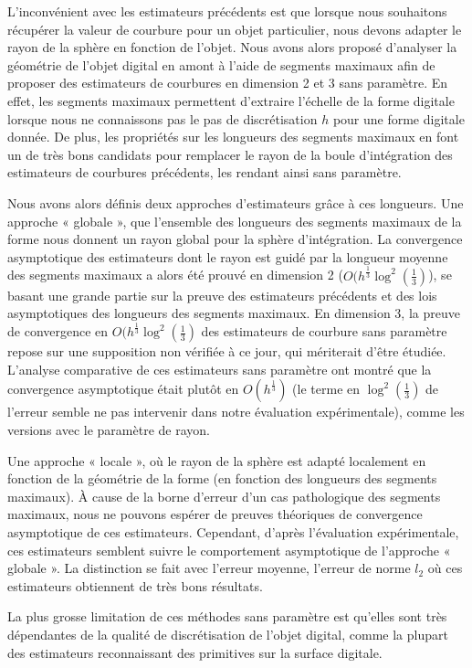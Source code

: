 L'inconvénient avec les estimateurs précédents est que lorsque nous souhaitons
récupérer la valeur de courbure pour un objet particulier, nous devons adapter
le rayon de la sphère en fonction de l'objet. Nous avons alors proposé
d'analyser la géométrie de l'objet digital en amont à l'aide de segments
maximaux afin de proposer des estimateurs de courbures en dimension 2 et 3 sans
paramètre. En effet, les segments maximaux permettent d'extraire l'échelle de la
forme digitale lorsque nous ne connaissons pas le pas de discrétisation $h$ pour
une forme digitale donnée. De plus, les propriétés sur les longueurs des
segments maximaux en font un de très bons candidats pour remplacer le rayon de
la boule d'intégration des estimateurs de courbures précédents, les rendant
ainsi sans paramètre.


Nous avons alors définis deux approches d'estimateurs grâce à ces longueurs. Une
approche « globale », \cad que l'ensemble des longueurs des segments maximaux de
la forme nous donnent un rayon global pour la sphère d'intégration. La
convergence asymptotique des estimateurs dont le rayon est guidé par la longueur
moyenne des segments maximaux a alors été prouvé en dimension 2
($O(h^\frac{1}{3} \log^2 \left(\frac{1}{3}\right)$), se basant une grande partie
sur la preuve des estimateurs précédents et des lois asymptotiques des longueurs
des segments maximaux. En dimension 3, la preuve de convergence en
$O(h^\frac{1}{3} \log^2 \left(\frac{1}{3}\right)$ des estimateurs de courbure
sans paramètre repose sur une supposition non vérifiée à ce jour, qui mériterait
d'être étudiée. L'analyse comparative de ces estimateurs sans paramètre ont
montré que la convergence asymptotique était plutôt en $O(h^\frac{1}{3})$ (le
terme en $\log^2 \left(\frac{1}{3}\right)$ de l'erreur semble ne pas intervenir
dans notre évaluation expérimentale), comme les versions avec le paramètre de
rayon.


Une approche « locale », où le rayon de la sphère est adapté localement en
fonction de la géométrie de la forme (en fonction des longueurs des segments
maximaux). À cause de la borne d'erreur d'un cas pathologique des segments
maximaux, nous ne pouvons espérer de preuves théoriques de convergence
asymptotique de ces estimateurs. Cependant, d'après l'évaluation expérimentale,
ces estimateurs semblent suivre le comportement asymptotique de l'approche «
globale ». La distinction se fait avec l'erreur moyenne, l'erreur de norme $l_2$
où ces estimateurs obtiennent de très bons résultats.


La plus grosse limitation de ces méthodes sans paramètre est qu'elles sont très
dépendantes de la qualité de discrétisation de l'objet digital, comme la plupart
des estimateurs reconnaissant des primitives sur la surface digitale.

